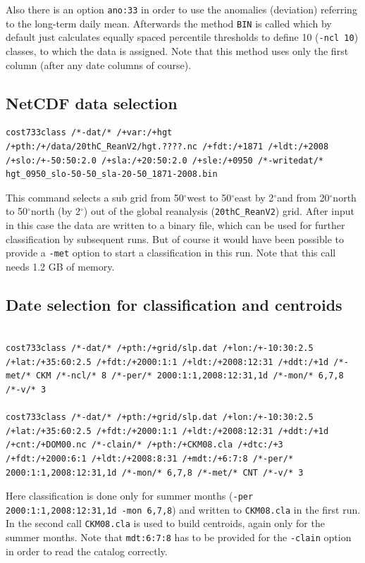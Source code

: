 \documentclass[12pt, oneside, a4paper, headsepline, plainheadsepline]{scrbook}
\newcommand{\degree}{\ensuremath{^\circ}}
\begin{document}
Also there is an option \verb+ano:33+ in order to use the anomalies (deviation) referring to the long-term daily mean.
Afterwards the method \verb+BIN+ is called which by default just calculates equally spaced percentile thresholds to define
10 (\verb+-ncl 10+) classes, to which the data is assigned. Note that this method uses only the first column (after any date columns of course).


\subsection{NetCDF data selection}
\begin{lstlisting}
cost733class /*-dat/* /+var:/+hgt /+pth:/+/data/20thC_ReanV2/hgt.????.nc /+fdt:/+1871 /+ldt:/+2008 /+slo:/+-50:50:2.0 /+sla:/+20:50:2.0 /+sle:/+0950 /*-writedat/* hgt_0950_slo-50-50_sla-20-50_1871-2008.bin
\end{lstlisting}
This command selects a sub grid from 50\degree west to 50\degree east by 2\degree and from 20\degree north to 50\degree north (by 2\degree)
out of the global reanalysis (\verb+20thC_ReanV2+) grid. After input in this case the data are written to a binary file, which can be used for further 
classification by subsequent runs. But of course it would have been possible to provide a \verb+-met+ option to start a classification in this run.
Note that this call needs 1.2 GB of memory.

\subsection{Date selection for classification and centroids}
\begin{lstlisting}

cost733class /*-dat/* /+pth:/+grid/slp.dat /+lon:/+-10:30:2.5 /+lat:/+35:60:2.5 /+fdt:/+2000:1:1 /+ldt:/+2008:12:31 /+ddt:/+1d /*-met/* CKM /*-ncl/* 8 /*-per/* 2000:1:1,2008:12:31,1d /*-mon/* 6,7,8 /*-v/* 3

cost733class /*-dat/* /+pth:/+grid/slp.dat /+lon:/+-10:30:2.5 /+lat:/+35:60:2.5 /+fdt:/+2000:1:1 /+ldt:/+2008:12:31 /+ddt:/+1d /+cnt:/+DOM00.nc /*-clain/* /+pth:/+CKM08.cla /+dtc:/+3 /+fdt:/+2000:6:1 /+ldt:/+2008:8:31 /+mdt:/+6:7:8 /*-per/* 2000:1:1,2008:12:31,1d /*-mon/* 6,7,8 /*-met/* CNT /*-v/* 3
\end{lstlisting}
Here classification is done only for summer months (\texttt{-per 2000:1:1,2008:12:31,1d -mon 6,7,8}) and written to 
\verb+CKM08.cla+ in the first run. In the second call \verb+CKM08.cla+ is used to build centroids, again only for the summer months.
Note that \verb+mdt:6:7:8+ has to be provided for the \verb+-clain+ option in order to read the catalog correctly.
\end{document}
